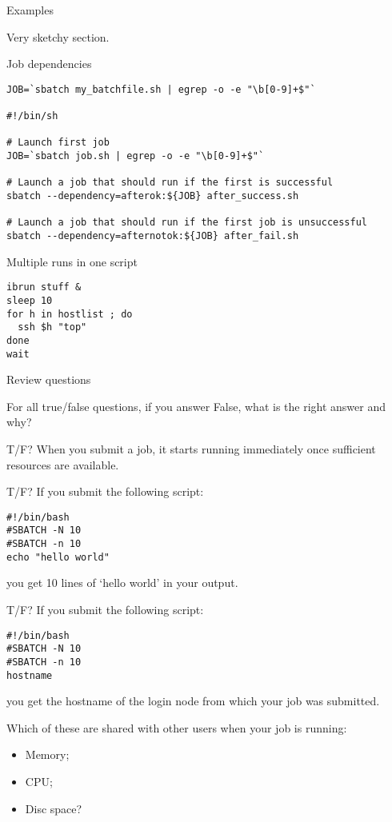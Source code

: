  {Examples}

Very sketchy section.

 {Job dependencies}

\begin{verbatim}
JOB=`sbatch my_batchfile.sh | egrep -o -e "\b[0-9]+$"`

#!/bin/sh

# Launch first job
JOB=`sbatch job.sh | egrep -o -e "\b[0-9]+$"`

# Launch a job that should run if the first is successful
sbatch --dependency=afterok:${JOB} after_success.sh

# Launch a job that should run if the first job is unsuccessful
sbatch --dependency=afternotok:${JOB} after_fail.sh
\end{verbatim}

 {Multiple runs in one script}

\begin{verbatim}
ibrun stuff &
sleep 10
for h in hostlist ; do
  ssh $h "top"
done
wait
\end{verbatim}

 {Review questions}

For all true/false questions,
if you answer False, what is the right answer and why?

\begin{exercise}
  T/F?
  When you submit a job, it starts running immediately once
  sufficient resources are available.
\end{exercise}

\begin{exercise}
  T/F? If you submit the following script:
\begin{verbatim}
#!/bin/bash
#SBATCH -N 10
#SBATCH -n 10
echo "hello world"
\end{verbatim}
you get 10 lines of `hello world' in your output.
\end{exercise}

\begin{exercise}
  T/F? If you submit the following script:
\begin{verbatim}
#!/bin/bash
#SBATCH -N 10
#SBATCH -n 10
hostname
\end{verbatim}
you get the hostname of the login node from which your job was submitted.
\end{exercise}

\begin{exercise}
  Which of these are shared with other users when your job is running:
  \begin{itemize}
  \item Memory;
  \item CPU;
  \item Disc space?
  \end{itemize}
\end{exercise}

